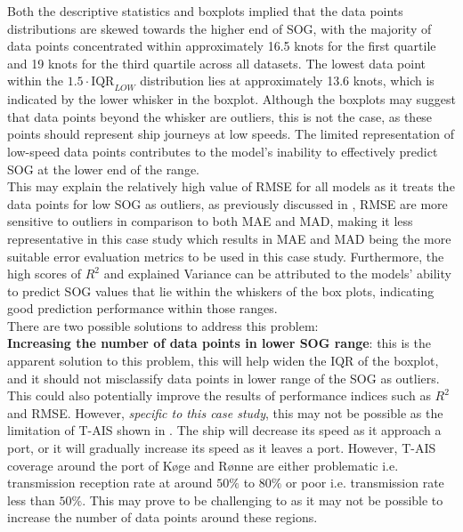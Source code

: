 Both the descriptive statistics and boxplots implied that the data points distributions are skewed towards the higher end of SOG, with the majority of data points concentrated within approximately 16.5 knots for the first quartile and 19 knots for the third quartile across all datasets. The lowest data point within the $1.5 \cdot \text{IQR}_{LOW}$ distribution lies at approximately 13.6 knots, which is indicated by the lower whisker in the boxplot. Although the boxplots may suggest that data points beyond the whisker are outliers, this is not the case, as these points should represent ship journeys at low speeds. The limited representation of low-speed data points contributes to the model's inability to effectively predict SOG at the lower end of the range.\\

This may explain the relatively high value of RMSE for all models as it treats the data points for low SOG as outliers, as previously discussed in , RMSE are more sensitive to outliers in comparison to both MAE and MAD, making it less representative in this case study which results in MAE and MAD being the more suitable error evaluation metrics to be used in this case study. Furthermore, the high scores of $R^2$ and explained Variance can be attributed to the models' ability to predict SOG values that lie within the whiskers of the box plots, indicating good prediction performance within those ranges.\\

There are two possible solutions to address this problem:\\ 

\textbf{Increasing the number of data points in lower SOG range}: this is the apparent solution to this problem, this will help widen the IQR of the boxplot, and it should not misclassify data points in lower range of the SOG as outliers. This could also potentially improve the results of performance indices such as $R^2$ and RMSE. However, \emph{specific to this case study}, this may not be possible as the limitation of T-AIS shown in . The ship will decrease its speed as it approach a port, or it will gradually increase its speed as it leaves a port. However, T-AIS coverage around the port of K{\o}ge and R{\o}nne are either problematic i.e. transmission reception rate at around $50\%$ to $80\%$ or poor i.e. transmission rate less than $50\%$. This may prove to be challenging to as it may not be possible to increase the number of data points around these regions.\\ 

